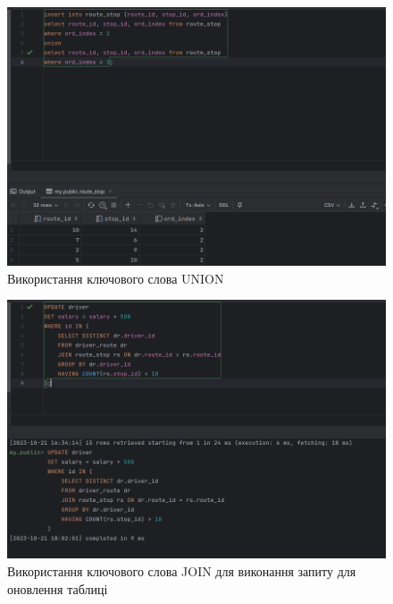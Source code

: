 \documentclass[14pt]{extreport}
\begin{document}
\begin{normalsize}
	\begin{figure}[H]
		\centering
		\includegraphics[scale=0.5]{2}
		\caption{Використання ключового слова UNION}
	\end{figure}
	
	\begin{figure}[H]
		\centering
		\includegraphics[scale=0.5]{3}
		\caption{Використання ключового слова JOIN для виконання запиту для оновлення таблиці}
	\end{figure}
	

\end{normalsize}
\end{document}
